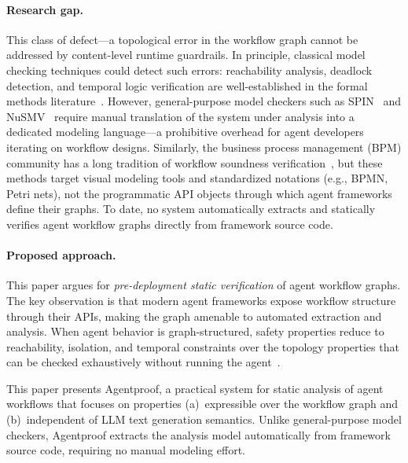 \paragraph{Research gap.}
This class of defect---a topological error in the workflow
graph cannot be addressed by content-level runtime guardrails. In
principle, classical model checking techniques could detect such
errors: reachability analysis, deadlock detection, and temporal logic
verification are well-established in the formal methods
literature~\citep{clarke1999modelchecking, baier2008modelchecking}.
However, general-purpose model checkers such as
SPIN~\citep{holzmann1997spin} and NuSMV~\citep{cimatti2002nusmv}
require manual translation of the system under analysis into a
dedicated modeling language---a prohibitive overhead for agent
developers iterating on workflow designs. Similarly, the business
process management (BPM) community has a long tradition of workflow
soundness verification~\citep{vanderaalst2011bpm}, but these methods
target visual modeling tools and standardized notations (e.g., BPMN,
Petri nets), not the programmatic API objects through which agent
frameworks define their graphs. To date, no system automatically
extracts and statically verifies agent workflow graphs directly from
framework source code.

\paragraph{Proposed approach.}
This paper argues for \emph{pre-deployment static verification} of
agent workflow graphs. The key observation is that modern agent
frameworks expose workflow structure through their APIs, making the
graph amenable to automated extraction and analysis. When agent behavior
is graph-structured, safety properties reduce to reachability,
isolation, and temporal constraints over the topology properties that
can be checked exhaustively without running the
agent~\citep{clarke1999modelchecking}.

This paper presents Agentproof, a practical system for static analysis
of agent workflows that focuses on properties (a)~expressible over the
workflow graph and (b)~independent of LLM text generation semantics.
Unlike general-purpose model checkers, Agentproof extracts the analysis
model automatically from framework source code, requiring no manual
modeling effort.

